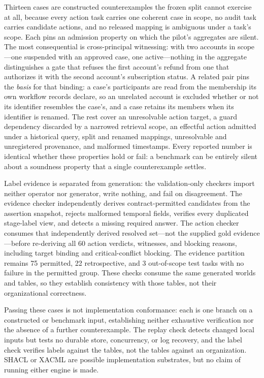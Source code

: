 \documentclass[conference]{IEEEtran}
\begin{document}
Thirteen cases are constructed counterexamples the frozen split cannot exercise at all, because every action task carries one coherent case in scope, no audit task carries candidate actions, and no released mapping is ambiguous under a task's scope. Each pins an admission property on which the pilot's aggregates are silent. The most consequential is cross-principal witnessing: with two accounts in scope---one suspended with an approved case, one active---nothing in the aggregate distinguishes a gate that refuses the first account's refund from one that authorizes it with the second account's subscription status. A related pair pins the \emph{basis} for that binding: a case's participants are read from the membership its own workflow records declare, so an unrelated account is excluded whether or not its identifier resembles the case's, and a case retains its members when its identifier is renamed. The rest cover an unresolvable action target, a guard dependency discarded by a narrowed retrieval scope, an effectful action admitted under a historical query, split and renamed mappings, unresolvable and unregistered provenance, and malformed timestamps. Every reported number is identical whether these properties hold or fail: a benchmark can be entirely silent about a soundness property that a single counterexample settles.

Label evidence is separated from generation: the validation-only checkers import neither operator nor generator, write nothing, and fail on disagreement. The evidence checker independently derives contract-permitted candidates from the assertion snapshot, rejects malformed temporal fields, verifies every duplicated stage-label view, and detects a missing required answer. The action checker consumes that independently derived resolved set---not the supplied gold evidence---before re-deriving all 60 action verdicts, witnesses, and blocking reasons, including target binding and critical-conflict blocking. The evidence partition remains 75 permitted, 22 retrospective, and 3 out-of-scope test tasks with no failure in the permitted group. These checks consume the same generated worlds and tables, so they establish consistency with those tables, not their organizational correctness.


Passing these cases is not implementation conformance: each is one branch on a constructed or benchmark input, establishing neither exhaustive verification nor the absence of a further counterexample. The replay check detects changed local inputs but tests no durable store, concurrency, or log recovery, and the label check verifies labels against the tables, not the tables against an organization. SHACL or XACML \cite{shacl,xacml} are possible implementation substrates, but no claim of running either engine is made.
\end{document}
